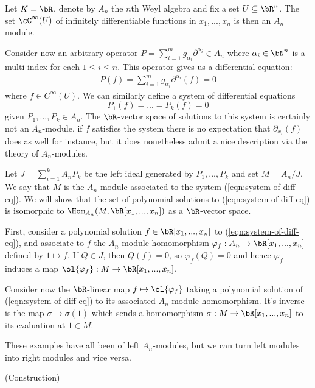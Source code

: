 \begin{example}\label{example:differential-equation}
	Let $K = \bR$, denote by $A_n$ the $n$th Weyl algebra and fix a set $U \subseteq \bR^n$. The set $\cC^\infty(U)$ of infinitely differentiable functions in $x_1,...,x_n$ is then an $A_n$ module.

	Consider now an arbitrary operator $P = \sum_{i=1}^m g_{\alpha_i} \partial^{\alpha_i} \in A_n$ where $\alpha_i \in \bN^n$ is a multi-index for each $1\leq i\leq n$. This operator gives us a differential equation:
	\begin{align*}
		P(f) = \sum_{i=1}^m g_{\alpha_i}\partial^{\alpha_i}(f) = 0
	\end{align*}
	where $f \in C^\infty(U)$. We can similarly define a system of differential equations
	\begin{equation}\label{eqn:system-of-diff-eq}
		P_1(f) = ... = P_k(f) = 0
	\end{equation}
	given $P_1,...,P_k \in A_n$. The $\bR$-vector space of solutions to this system is certainly not an $A_n$-module, if $f$ satisfies the system there is no expectation that $\partial_{x_i}(f)$ does as well for instance, but it does nonetheless admit a nice description via the theory of $A_n$-modules.

	Let $J = \sum_{i=1}^k A_nP_k$ be the left ideal generated by $P_1,...,P_k$ and set $M = A_n/J$. We say that $M$ is the $A_n$-module associated to the system (\ref{eqn:system-of-diff-eq}). We will show that the set of polynomial solutions to (\ref{eqn:system-of-diff-eq}) is isomorphic to $\Hom_{A_n}(M,\bR[x_1,...,x_n])$ as a $\bR$-vector space.

	First, consider a polynomial solution $f \in \bR[x_1,...,x_n]$ to (\ref{eqn:system-of-diff-eq}), and associate to $f$ the $A_n$-module homomorphism $\varphi_f:A_n\to \bR[x_1,...,x_n]$ defined by $1 \mapsto f$. If $Q \in J$, then $Q(f) = 0$, so $\varphi_f(Q) = 0$ and hence $\varphi_f$ induces a map $\ol{\varphi_f}:M\to\bR[x_1,...,x_n]$.

	Consider now the $\bR$-linear map $f\mapsto \ol{\varphi_f}$ taking a polynomial solution of (\ref{eqn:system-of-diff-eq}) to its associated $A_n$-module homomorphism. It's inverse is the map $\sigma \mapsto \sigma(1)$ which sends a homomorphism $\sigma:M\to \bR[x_1,...,x_n]$ to its evaluation at $1 \in M$.
\end{example}

These examples have all been of left $A_n$-modules, but we can turn left modules into right modules and vice versa. 
\begin{example}(Construction)\label{example}
	
\end{example}

